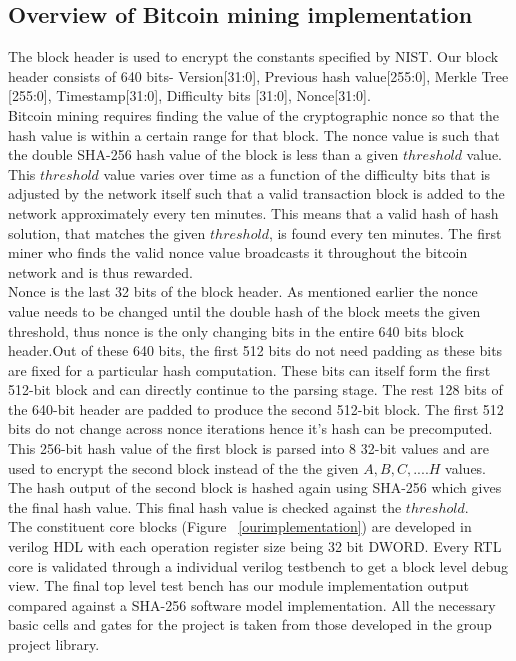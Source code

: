 \subsection{Overview of Bitcoin mining implementation}
The block header is used to encrypt the constants specified by NIST. Our block header consists of 640 bits- Version[31:0], Previous hash value[255:0], Merkle Tree [255:0], Timestamp[31:0], Difficulty bits [31:0], Nonce[31:0].
\\Bitcoin mining requires finding the value of the cryptographic nonce so that the hash value is within a certain range for that block. The nonce value is such that the double SHA-256 hash value of the block is less than a given $threshold$ value. This $threshold$ value varies over time as a function of the difficulty bits that is adjusted by the network itself such that a valid transaction block is added to the network approximately every ten minutes. This means that a valid hash of hash solution, that matches the given $threshold$, is found every ten minutes. The first miner who finds the valid nonce value broadcasts it throughout the bitcoin network and is thus rewarded. 
\\Nonce is the last 32 bits of the block header. As mentioned earlier the nonce value needs to be changed until the double hash of the block meets the given threshold, thus nonce is the only changing bits in the entire 640 bits block header.Out of these 640 bits, the first 512 bits do not need padding as these bits are fixed for a particular hash computation. These bits can itself form the first 512-bit block and can directly continue to the parsing stage. The rest 128 bits of the 640-bit header are padded to produce the second 512-bit block. The first 512 bits do not change across nonce iterations hence it's hash can be precomputed. This 256-bit hash value of the first block is parsed into 8 32-bit values and are used to encrypt the second block instead of the the given $A, B, C,....H$ values. The hash output of the second block is hashed again using SHA-256 which gives the final hash value. This final hash value is checked against the $threshold$.
\\The constituent core blocks (Figure ~\ref{ourimplementation}) are developed in verilog HDL with each operation register size being 32 bit DWORD. Every RTL core is validated through a individual verilog testbench to get a block level debug view. The final top level test bench has our module implementation output compared against a SHA-256 software model implementation. All the necessary basic cells and gates for the project is taken from those developed in the group project library. 

